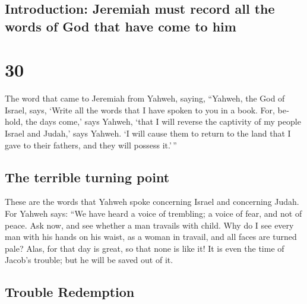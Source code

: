 \begin{paracol}{2}
\switchcolumn
\begin{otherlanguage}{english}

\hypertarget{introduction-jeremiah-must-record-all-the-words-of-god-that-have-come-to-him}{%
\subsection{Introduction: Jeremiah must record all the words of God that
have come to
him}\label{introduction-jeremiah-must-record-all-the-words-of-god-that-have-come-to-him}}

\hypertarget{section-59}{%
\section{30}\label{section-59}}

 The word that came to Jeremiah from Yahweh, saying,
 ``Yahweh, the God of Israel, says, `Write all the words
that I have spoken to you in a book.  For, behold, the
days come,' says Yahweh, `that I will reverse the captivity of my people
Israel and Judah,' says Yahweh. `I will cause them to return to the land
that I gave to their fathers, and they will possess it.'\,''

\hypertarget{the-terrible-turning-point}{%
\subsection{The terrible turning
point}\label{the-terrible-turning-point}}

 These are the words that Yahweh spoke concerning Israel
and concerning Judah.  For Yahweh says: ``We have heard a
voice of trembling; a voice of fear, and not of peace. 
Ask now, and see whether a man travails with child. Why do I see every
man with his hands on his waist, as a woman in travail, and all faces
are turned pale?  Alas, for that day is great, so that
none is like it! It is even the time of Jacob's trouble; but he will be
saved out of it.

\hypertarget{trouble-redemption}{%
\subsection{Trouble Redemption}\label{trouble-redemption}}


\end{otherlanguage}
\end{paracol}
